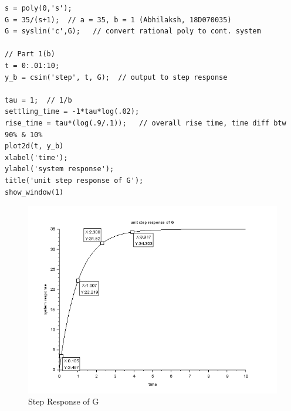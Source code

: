 \documentclass[12pt]{article}
\begin{document}
\begin{verbatim}
s = poly(0,'s');
G = 35/(s+1);  // a = 35, b = 1 (Abhilaksh, 18D070035)
G = syslin('c',G);   // convert rational poly to cont. system

// Part 1(b)
t = 0:.01:10;
y_b = csim('step', t, G);  // output to step response

tau = 1;  // 1/b
settling_time = -1*tau*log(.02);
rise_time = tau*(log(.9/.1));   // overall rise time, time diff btw 90% & 10%
plot2d(t, y_b)
xlabel('time');
ylabel('system response');
title('unit step response of G');
show_window(1)
\end{verbatim}
    \begin{figure}[H]
        \centering
        \includegraphics[scale=0.8]{q1_a.png}
        \caption{Step Response of G}
        \label{fig:my_label}
    \end{figure}
 
\end{document}
